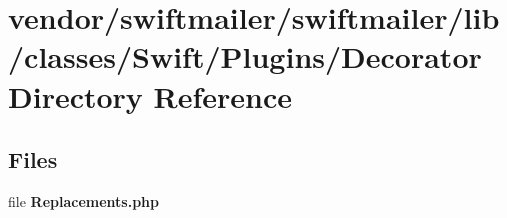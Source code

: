\section{vendor/swiftmailer/swiftmailer/lib/classes/\+Swift/\+Plugins/\+Decorator Directory Reference}
\label{dir_e6227370a0d34d4c98a3745a2381467c}
\subsection*{Files}
\begin{DoxyCompactItemize}
\item 
file {\bf Replacements.\+php}
\end{DoxyCompactItemize}
